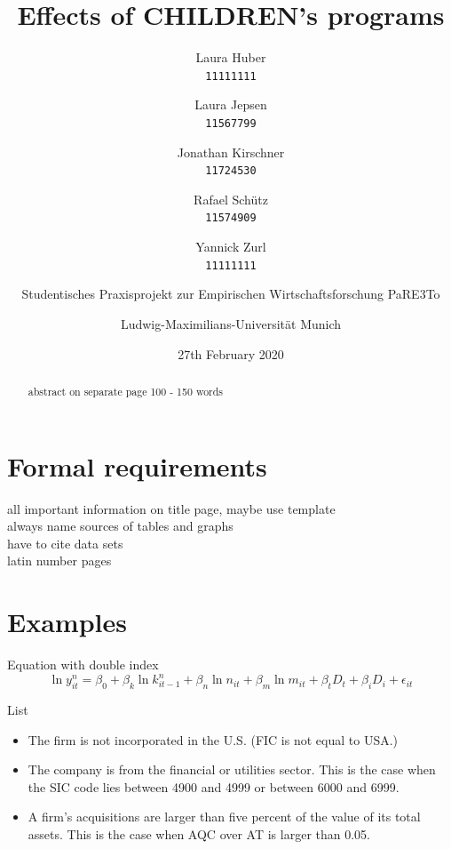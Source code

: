 \documentclass[12pt, a4paper, titlepage]{article}\usepackage[]{graphicx}\usepackage[]{color}
\title{Effects of CHILDREN's programs}
\author{
Laura Huber\\
\texttt{11111111}
\and
Laura Jepsen\\
\texttt{11567799}
\and
Jonathan Kirschner\\
\texttt{11724530}
\and
Rafael Schütz\\
\texttt{11574909} 
\and 
Yannick Zurl\\
\texttt{11111111}
\and
Studentisches Praxisprojekt zur Empirischen Wirtschaftsforschung PaRE3To\\
\and
Ludwig-Maximilians-Universität Munich
}
\date{27th February 2020}
\begin{document}
\maketitle

\tableofcontents
\listoftables

\listoffigures

\begin{abstract} 
abstract on separate page
100 - 150 words
\end{abstract}

\section{Formal requirements}
all important information on title page, maybe use template\\
always name sources of tables and graphs\\
have to cite data sets\\
latin number pages\\


\section{Examples}

Equation with double index\\

\begin{equation}
\label{ModelProdu}
\ln y_{it}^{n} = \beta_0 + \beta_k \ln k_{it-1}^{n} + \beta_n \ln n_{it} + \beta_m \ln m_{it} + \beta_t D_t + \beta_i D_i + \epsilon_{it}
\end{equation}

List\\

\begin{itemize}
  \item{The firm is not incorporated in the U.S. (FIC is not equal to USA.)}
  \item{The company is from the financial or utilities sector. This is the case when the SIC code lies between 4900 and 4999 or between 6000 and 6999.}
  \item{A firm's acquisitions are larger than five percent of the value of its total assets. This is the case when AQC over AT is larger than 0.05.} 
\end{itemize}
\end{document}
